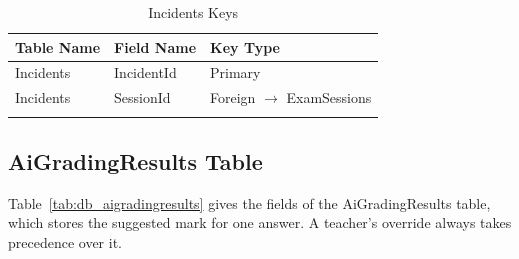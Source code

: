 {\small
\begin{longtable}{>{\raggedright\arraybackslash}p{4.0cm}>{\raggedright\arraybackslash}p{4.6cm}>{\raggedright\arraybackslash}p{4.6cm}}
\caption{Incidents Keys}\label{tab:keys_incidents}\\
\hline\hline
\textbf{Table Name} & \textbf{Field Name} & \textbf{Key Type} \\ \hline
\endfirsthead
\hline\hline
\endlastfoot
Incidents & IncidentId & Primary \\*
Incidents & SessionId & Foreign $\rightarrow$ ExamSessions \\*
\end{longtable}
}

\par\ifdim\dimexpr\pagegoal-\pagetotal\relax<376pt\newpage\fi
\subsection{AiGradingResults Table}
Table~\ref{tab:db_aigradingresults} gives the fields of the AiGradingResults table, which stores the suggested mark for one answer. A teacher's override always takes precedence over it.

